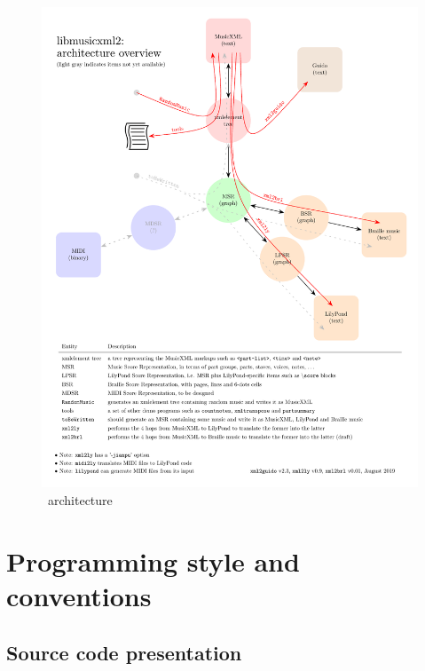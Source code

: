 \documentclass[12pt,a4paper]{article}
\begin{document}
\begin{figure}
\caption{\lib\ architecture}
\includegraphics[scale=0.8]{../libmusicxmlArchitecture/libmusicxmlArchitecture.pdf}
\end{figure}


\section{Programming style and conventions}

\subsection{Source code presentation}
\end{document}
